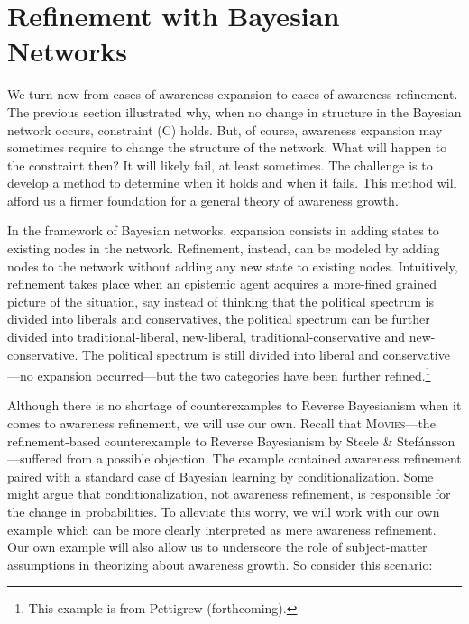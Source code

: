 \documentclass[
  11pt,
  dvipsnames,enabledeprecatedfontcommands]{scrartcl}
\begin{document}
\hypertarget{refinement-with-bayesian-networks}{%
\section{Refinement with Bayesian
Networks}\label{refinement-with-bayesian-networks}}

\label{sec:structural-both}

We turn now from cases of awareness expansion to cases of awareness
refinement. The previous section illustrated why, when no change in
structure in the Bayesian network occurs, constraint (C) holds. But, of
course, awareness expansion may sometimes require to change the
structure of the network. What will happen to the constraint then? It
will likely fail, at least sometimes. The challenge is to develop a
method to determine when it holds and when it fails. This method will
afford us a firmer foundation for a general theory of awareness growth.

In the framework of Bayesian networks, expansion consists in adding
states to existing nodes in the network. Refinement, instead, can be
modeled by adding nodes to the network without adding any new state to
existing nodes. Intuitively, refinement takes place when an epistemic
agent acquires a more-fined grained picture of the situation, say
instead of thinking that the political spectrum is divided into liberals
and conservatives, the political spectrum can be further divided into
traditional-liberal, new-liberal, traditional-conservative and
new-conservative. The political spectrum is still divided into liberal
and conservative---no expansion occurred---but the two categories have
been further refined.\footnote{This example is from Pettigrew
  (forthcoming).}

Although there is no shortage of counterexamples to Reverse Bayesianism
when it comes to awareness refinement, we will use our own. Recall that
\textsc{Movies}---the refinement-based counterexample to Reverse
Bayesianism by Steele \& Stefánsson---suffered from a possible
objection. The example contained awareness refinement paired with a
standard case of Bayesian learning by conditionalization. Some might
argue that conditionalization, not awareness refinement, is responsible
for the change in probabilities. To alleviate this worry, we will work
with our own example which can be more clearly interpreted as mere
awareness refinement. Our own example will also allow us to underscore
the role of subject-matter assumptions in theorizing about awareness
growth. So consider this scenario:
\end{document}
